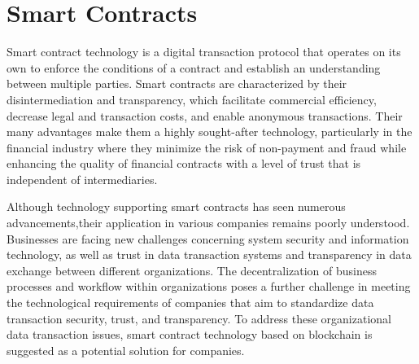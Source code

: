 \section{Smart Contracts}

Smart contract technology is a digital transaction protocol that operates on its own to enforce the conditions of a contract and establish an understanding between multiple parties. Smart contracts are characterized by their disintermediation and transparency, which facilitate commercial efficiency, decrease legal and transaction costs, and enable anonymous transactions. Their many advantages make them a highly sought-after technology, particularly in the financial industry where they minimize the risk of non-payment and fraud while enhancing the quality of financial contracts with a level of trust that is independent of intermediaries.

Although technology supporting smart contracts has seen numerous advancements,their application in various companies remains poorly understood. Businesses are facing new challenges concerning system security and information technology, as well as trust in data transaction systems and transparency in data exchange between different organizations. The decentralization of business processes and workflow within organizations poses a further challenge in meeting the technological requirements of companies that aim to standardize data transaction security, trust, and transparency. To address these organizational data transaction issues, smart contract technology based on blockchain is suggested as a potential solution for companies.

